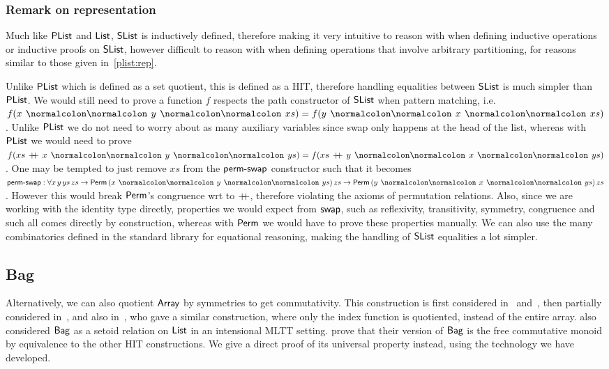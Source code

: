 \subsubsection*{Remark on representation}\label{slist:rep}
Much like $\operatorname{\mathsf{PList}}$ and $\operatorname{\mathsf{List}}$, $\operatorname{\mathsf{SList}}$ is inductively defined, therefore making it very intuitive to reason
with when defining inductive operations or inductive proofs on $\operatorname{\mathsf{SList}}$, however difficult to reason with
when defining operations that involve arbitrary partitioning, for reasons similar to those given
in~\cref{plist:rep}.
\begin{toappendix}
    Unlike $\operatorname{\mathsf{PList}}$ which is defined as a set quotient, this is defined as a HIT, therefore handling equalities
    between $\operatorname{\mathsf{SList}}$ is much simpler than $\operatorname{\mathsf{PList}}$. We would still need to prove a function $f$ respects
    the path constructor of $\operatorname{\mathsf{SList}}$ when pattern matching, i.e. $f(x \cons y \cons xs) = f(y \cons x \cons xs)$.
    Unlike $\operatorname{\mathsf{PList}}$ we do not need to worry about as many auxiliary variables since swap
    only happens at the head of the list, whereas with $\operatorname{\mathsf{PList}}$ we would need to prove
    $f(xs\,\concat\,x \cons y \cons ys) = f(xs\,\concat\,y \cons x \cons ys)$. One may be tempted to just remove $xs$
    from the $\operatorname{\mathsf{perm-swap}}$ constructor such that it becomes
    $\term{perm-swap} : \forall x\,y\,ys\,zs \to \Perm\,(x \cons y \cons ys)\,zs \to \Perm\,(y \cons x \cons ys)\,zs$.
    However this would break $\operatorname{\mathsf{Perm}}$'s congruence wrt to $\mathbin{+\kern -0.4em+}$, therefore violating the axioms of
    permutation relations. Also, since we are working with the identity type directly, properties we would
    expect from $\operatorname{\mathsf{swap}}$, such as reflexivity, transitivity, symmetry, congruence and such all comes directly by
    construction, whereas with $\operatorname{\mathsf{Perm}}$ we would have to prove these properties manually.
    We can also use the many combinatorics defined in the standard library for equational reasoning,
    making the handling of $\operatorname{\mathsf{SList}}$ equalities a lot simpler.
\end{toappendix}

\subsection{Bag}\label{cmon:bag}
Alternatively, we can also quotient $\operatorname{\mathsf{Array}}$ by symmetries to get commutativity.
%
This construction is first considered in~\cite{altenkirchDefinableQuotientsType2011}
and~\cite{liQuotientTypesType2015}, then partially considered in~\cite{choudhuryFreeCommutativeMonoids2023},
and also in~\cite{joramConstructiveFinalSemantics2023},
who gave a similar construction, where only the index function is quotiented, instead of
the entire array.
%
\cite{danielssonBagEquivalenceProofRelevant2012} also considered $\operatorname{\mathsf{Bag}}$ as a setoid relation
on $\operatorname{\mathsf{List}}$ in an intensional MLTT setting.
%
\cite{joramConstructiveFinalSemantics2023} prove that their version of $\operatorname{\mathsf{Bag}}$
is the free commutative monoid by equivalence to the other HIT constructions.
%
We give a direct proof of its universal property instead, using the technology we have developed.

